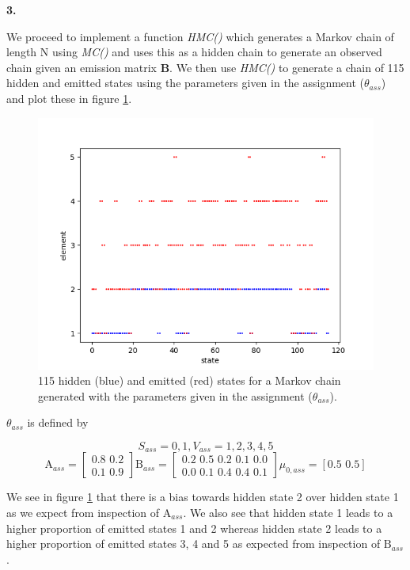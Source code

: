 \documentclass{article}
\begin{document}
\textbf{\large{3.}}

We proceed to implement a function \textit{HMC()} which generates a Markov chain of length N using \textit{MC()} and uses this as a hidden chain to generate an observed chain given an emission matrix \textbf{B}.
We then use \textit{HMC()} to generate a chain of 115 hidden and emitted states using the parameters given in the assignment ($\theta_{ass}$) and plot these in figure \ref{fig:ho}.


\begin{figure}[h]
\centering
\includegraphics[width = 0.5\linewidth, trim={0 0 0 0}, clip=true]{ho.png}
\caption{115 hidden (blue) and emitted (red) states for a Markov chain generated with the parameters given in the assignment ($\theta_{ass}$).}
\label{fig:ho}
\end{figure}

$\theta_{ass}$ is defined by

\begin{equation}
S_{ass} = {0,1},V_{ass} = {1,2,3,4,5}
\end{equation}
\begin{equation}
\text{A}_{ass} = \begin{bmatrix} 0.8\,\, 0.2 \\ 0.1\,\, 0.9 \end{bmatrix}
\text{B}_{ass} = \begin{bmatrix} 0.2\,\, 0.5\,\, 0.2\,\, 0.1\,\, 0.0 \\ 0.0\,\, 0.1\,\, 0.4\,\, 0.4\,\, 0.1 \end{bmatrix}
\mu_{0, ass} = [0.5\,\, 0.5]
\end{equation}

We see in figure \ref{fig:ho} that there is a bias towards hidden state 2 over hidden state 1 as we expect from inspection of $\text{A}_{ass}$. We also see that hidden state 1 leads to a higher proportion of emitted states 1 and 2 whereas hidden state 2 leads to a higher proportion of emitted states 3, 4 and 5 as expected from inspection of $\text{B}_{ass}$.
\end{document}
